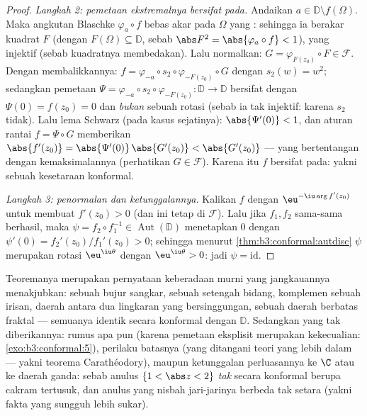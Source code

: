 \begin{proof}
\emph{Langkah 2: pemetaan ekstremalnya bersifat pada.} Andaikan $a \in
\mathbb D\setminus f(\Omega)$. Maka angkutan Blaschke
$\varphi_a\circ f$ bebas akar pada $\Omega$ yang : sehingga ia berakar kuadrat  $F$ (dengan
$F(\Omega) \subseteq \mathbb D$, sebab $\abs F^2 =
\abs{\varphi_a\circ f} < 1$), yang injektif (sebab kuadratnya
membedakan). Lalu normalkan: $G = \varphi_{F(z_0)}\circ F \in
\mathcal F$. Dengan membalikkannya: $f = \varphi_{-a}\circ s_2 \circ
\varphi_{-F(z_0)}\circ G$ dengan $s_2(w) = w^2$; sedangkan pemetaan $\Psi
= \varphi_{-a}\circ s_2\circ\varphi_{-F(z_0)} \colon \mathbb D
\to \mathbb D$ bersifat  dengan $\Psi(0) = f(z_0) = 0$ dan
\emph{bukan} sebuah rotasi (sebab ia tak injektif: karena $s_2$ tidak).
Lalu lema Schwarz (pada kasus sejatinya): $\abs{\Psi'(0)} < 1$, dan
aturan rantai $f = \Psi\circ G$ memberikan $\abs{f'(z_0)} =
\abs{\Psi'(0)}\,\abs{G'(z_0)} < \abs{G'(z_0)}$ ---
yang bertentangan dengan kemaksimalannya (perhatikan $G \in \mathcal F$). Karena itu $f$
bersifat pada: yakni sebuah kesetaraan konformal.

\emph{Langkah 3: penormalan dan ketunggalannya.} Kalikan $f$ dengan
$\eu^{-\iu\arg f'(z_0)}$ untuk membuat $f'(z_0) > 0$ (dan ini tetap di
$\mathcal F$). Lalu jika $f_1, f_2$ sama-sama berhasil, maka $\psi =
f_2\circ f_1^{-1} \in \operatorname{Aut}(\mathbb D)$ menetapkan
$0$ dengan $\psi'(0) = f_2'(z_0)/f_1'(z_0) > 0$; sehingga menurut
\cref{thm:b3:conformal:autdisc} $\psi$ merupakan rotasi
$\eu^{\iu\theta}$ dengan $\eu^{\iu\theta} > 0$: jadi $\psi =
\mathrm{id}$.
\end{proof}

\begin{remark}\label{rem:b3:conformal:rmtscope}
Teoremanya merupakan pernyataan keberadaan murni yang jangkauannya
menakjubkan: sebuah bujur sangkar, sebuah setengah bidang, komplemen sebuah irisan,
daerah antara dua lingkaran yang bersinggungan, sebuah daerah berbatas fraktal
--- semuanya identik secara konformal dengan $\mathbb D$. Sedangkan yang tak
diberikannya: rumus apa pun (karena pemetaan eksplisit merupakan kekecualian:
\cref{exo:b3:conformal:5}), perilaku batasnya (yang ditangani teori yang lebih dalam
--- yakni teorema Carathéodory), maupun ketunggalan
perluasannya ke $\C$ atau ke daerah  ganda: sebab
anulus $\{1 < \abs z < 2\}$ \emph{tak} secara konformal berupa
cakram tertusuk, dan anulus yang nisbah jari-jarinya berbeda
tak setara (yakni fakta yang sungguh lebih sukar).
\end{remark}

